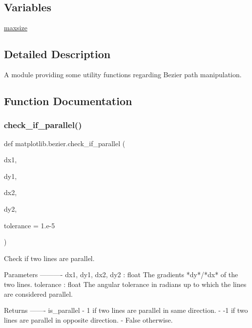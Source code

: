 \subsection*{Variables}
\begin{DoxyCompactItemize}
\item 
\hyperlink{namespacematplotlib_1_1bezier_acb9a050d8abfc0f15543650934e49eac}{maxsize}
\end{DoxyCompactItemize}


\subsection{Detailed Description}
\begin{DoxyVerb}A module providing some utility functions regarding Bezier path manipulation.
\end{DoxyVerb}
 

\subsection{Function Documentation}
\mbox{\label{namespacematplotlib_1_1bezier_a632097a44132aa1f6b5f71ea60a74495}} 
\subsubsection{\texorpdfstring{check\+\_\+if\+\_\+parallel()}{check\_if\_parallel()}}
{\footnotesize\ttfamily def matplotlib.\+bezier.\+check\+\_\+if\+\_\+parallel (\begin{DoxyParamCaption}\item[{}]{dx1,  }\item[{}]{dy1,  }\item[{}]{dx2,  }\item[{}]{dy2,  }\item[{}]{tolerance = {\ttfamily 1.e-\/5} }\end{DoxyParamCaption})}

\begin{DoxyVerb}Check if two lines are parallel.

Parameters
----------
dx1, dy1, dx2, dy2 : float
    The gradients *dy*/*dx* of the two lines.
tolerance : float
    The angular tolerance in radians up to which the lines are considered
    parallel.

Returns
-------
is_parallel
    - 1 if two lines are parallel in same direction.
    - -1 if two lines are parallel in opposite direction.
    - False otherwise.
\end{DoxyVerb}
 \mbox{\label{namespacematplotlib_1_1bezier_ad94e57c5dc18ec3824e768991f20a635}} 
